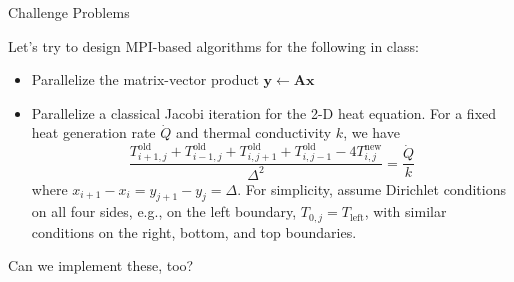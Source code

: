 \documentclass[10pt]{beamer}
\begin{document}
\begin{frame}{Challenge Problems}

Let's try to design MPI-based algorithms for the following in class:
\begin{itemize}
\item Parallelize the matrix-vector product $\mathbf{y} \leftarrow \mathbf{Ax}$
 \item Parallelize a classical Jacobi iteration for the 2-D heat equation.
 For a fixed heat generation rate
$\dot{Q}$ and thermal conductivity $k$, we have 
\begin{equation}
 \frac{T^{\text{old}}_{i+1,j} + T^{\text{old}}_{i-1,j} + 
       T^{\text{old}}_{i,j+1} + T^{\text{old}}_{i, j-1} - 
       4T^{\text{new}}_{i,j}}
      {\Delta^2} = \frac{\dot{Q}}{k}
\end{equation}
where $x_{i+1}-x_{i} = y_{j+1}-y_{j} = \Delta$.  For simplicity,
assume Dirichlet conditions on all four sides, e.g., on the 
left boundary, $T_{0,j} = T_{\text{left}}$, with similar conditions
on the right, bottom, and top boundaries. 
\end{itemize}

\vfill 

Can we implement these, too?

\end{frame}
\end{document}
